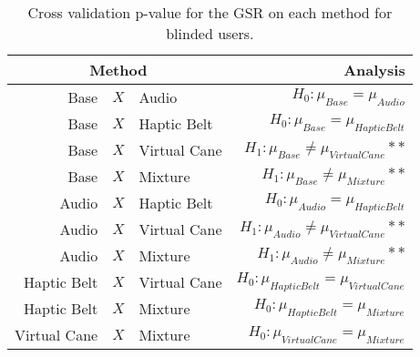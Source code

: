 
\begin{table}[!htb]
\centering
\caption{Cross validation p-value for the GSR on each method for blinded users.}
\label{tab:lsd_gsr}
\begin{tabular}{rclr}
\toprule
      \multicolumn{3}{c}{Method} &                                       Analysis \\
\midrule
              Base & $X$ & Audio &               $H_0 : \mu_{Base} = \mu_{Audio}$ \\
        Base & $X$ & Haptic Belt &         $H_0 : \mu_{Base} = \mu_{Haptic Belt}$ \\
       Base & $X$ & Virtual Cane &    $H_1 : \mu_{Base} \ne \mu_{Virtual Cane}**$ \\
            Base & $X$ & Mixture &         $H_1 : \mu_{Base} \ne \mu_{Mixture}**$ \\
       Audio & $X$ & Haptic Belt &        $H_0 : \mu_{Audio} = \mu_{Haptic Belt}$ \\
      Audio & $X$ & Virtual Cane &   $H_1 : \mu_{Audio} \ne \mu_{Virtual Cane}**$ \\
           Audio & $X$ & Mixture &        $H_1 : \mu_{Audio} \ne \mu_{Mixture}**$ \\
Haptic Belt & $X$ & Virtual Cane & $H_0 : \mu_{Haptic Belt} = \mu_{Virtual Cane}$ \\
     Haptic Belt & $X$ & Mixture &      $H_0 : \mu_{Haptic Belt} = \mu_{Mixture}$ \\
    Virtual Cane & $X$ & Mixture &     $H_0 : \mu_{Virtual Cane} = \mu_{Mixture}$ \\
\bottomrule
\end{tabular}
\end{table}

